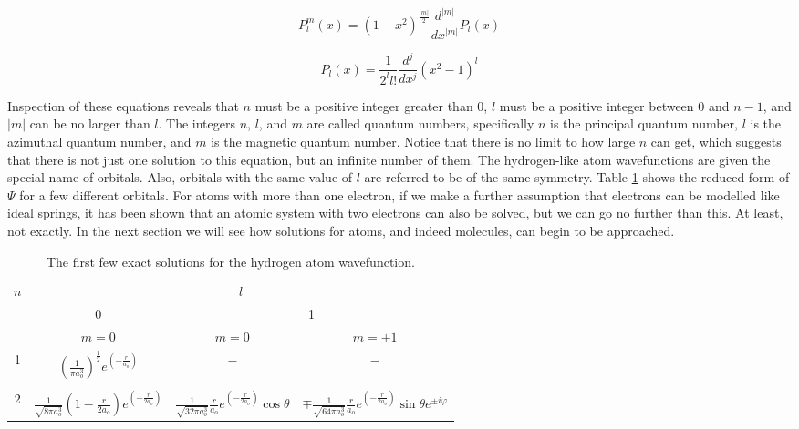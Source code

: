 \begin{equation}
\label{eq:wavehydro_Y2}
P^{m}_{l}(x) = (1 - x^{2})^{\frac{|m|}{2}}\frac{d^{|m|}}{dx^{|m|}}P_{l}(x)
\end{equation}

\begin{equation}
\label{eq:wavehydro_Y3}
P_{l}(x) = \frac{1}{2^{l}l!}\frac{d^{j}}{dx^{j}}(x^{2}-1)^{l}
\end{equation} 

Inspection of these equations reveals that $n$ must be a positive integer greater than 0, $l$ must be a positive integer between 0 and $n-1$, and $|m|$ can be no larger than $l$. The integers $n$, $l$, and $m$ are called quantum numbers, specifically $n$ is the principal quantum number, $l$ is the azimuthal quantum number, and $m$ is the magnetic quantum number. Notice that there is no limit to how large $n$ can get, which suggests that there is not just one solution to this equation, but an infinite number of them. The hydrogen-like atom wavefunctions are given the special name of orbitals. Also, orbitals with the same value of $l$ are referred to be of the same symmetry. Table \ref{tab:hsol} shows the reduced form of $\Psi$ for a few different orbitals. For atoms with more than one electron, if we make a further assumption that electrons can be modelled like ideal springs, it has been shown that an atomic system with two electrons can also be solved\cite{harmonium}, but we can go no further than this. At least, not exactly. In the next section we will see how solutions for atoms, and indeed molecules, can begin to be approached.

\begin{table}[h!]
\caption{The first few exact solutions for the hydrogen atom wavefunction.}
\label{tab:hsol}
\centering
\begin{tabular}{cccc}
\toprule
$n$	&	\multicolumn{3}{c}{$l$}	\\
\cmidrule(lr){1-1} \cmidrule(lr){2-4}
				&	0		&	\multicolumn{2}{c}{1}	\\ 
					\cmidrule(lr){2-2} \cmidrule(lr){3-4}
				&	$m=0$	&	$m=0$	&	$m=\pm1$	\\
\midrule
1	&	$\displaystyle\left(\frac{1}{\pi a_{o}^{3}}\right)^{\frac{1}{2}}e^{\left(-\frac{r}{a_{o}}\right)}$			&	$-$	&	$-$	\\
\\
2	&	$\displaystyle\frac{1}{\sqrt{8\pi a_{o}^{3}}}\left(1-\frac{r}{2a_{o}}\right)e^{\left(-\frac{r}{2a_{o}}\right)}$	&	$\displaystyle\frac{1}{\sqrt{32\pi a_{o}^{3}}}\frac{r}{a_{o}}e^{\left(-\frac{r}{2a_{o}}\right)}\cos\theta $	&	
$\displaystyle\mp\frac{1}{\sqrt{64\pi a_{o}^{3}}}\frac{r}{a_{o}}e^{\left(-\frac{r}{2a_{o}}\right)}\sin\theta e^{\pm i \varphi}$	\\
\bottomrule
\end{tabular}
\end{table}

